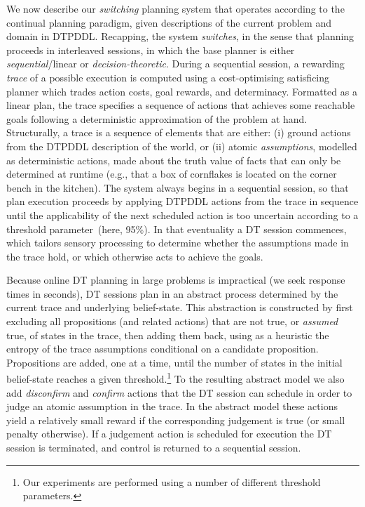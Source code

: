
We now describe our {\em switching} planning system that operates
according to the continual planning paradigm, given descriptions of
the current problem and domain in DTPDDL. Recapping, the system {\em
switches}, in the sense that planning proceeds in interleaved
sessions, in which the base planner is either {\em sequential}/linear
or {\em decision-theoretic}.
During a sequential session, a rewarding {\em trace} of a possible
execution is computed using a cost-optimising satisficing planner
which trades action costs, goal rewards, and determinacy.
Formatted as a linear plan, the trace specifies a sequence of actions
that achieves some reachable goals following a deterministic
approximation of the problem at hand.
Structurally, a trace is a sequence of elements that are either: (i) ground
actions from the DTPDDL description of the world, or (ii) atomic {\em
assumptions}, modelled as deterministic actions, made about the truth
value of facts that can only be determined at runtime (e.g., that a
box of cornflakes is located on the corner bench in the kitchen).
The system always begins in a sequential session, so that plan
execution proceeds by applying DTPDDL actions from the trace in
sequence until the applicability of the next scheduled action is too
uncertain according to a threshold parameter~(here, 95\%). In that
eventuality a DT session commences, which tailors sensory processing
to determine whether the assumptions made in the trace hold, or which
otherwise acts to achieve the goals. 


Because online DT planning in large problems is impractical (we seek
response times in seconds), DT sessions plan in an abstract process
determined by the current trace and underlying belief-state. This
abstraction is constructed by first excluding all propositions (and
related actions) that are not true, or {\em assumed } true, of states
in the trace, then adding them back, using as a heuristic the entropy
of the trace assumptions conditional on a candidate
proposition. Propositions are added, one at a time, until the number
of states in the initial belief-state reaches a given
threshold.\footnote{Our experiments are performed using a number of
different threshold parameters.}  To the resulting abstract model we
also add {\em disconfirm} and {\em confirm} actions that the
DT session can schedule in order to judge an atomic assumption
in the trace. In the abstract model these actions yield a relatively
small reward if the corresponding judgement is true (or small penalty
otherwise). If a judgement action is scheduled for execution the
DT session is terminated, and control is returned to a
sequential session.


